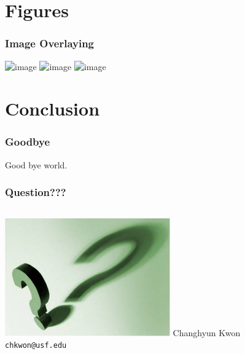 \documentclass[xcolor=dvipsnames, unicode, mathserif]{beamer}
\begin{document}

\section[Figures]{Figures}



\begin{frame}
\frametitle{Image Overlaying}
\begin{center}
\includegraphics<1>[width=0.7\textwidth]{image-a}
\includegraphics<2>[width=0.7\textwidth]{image-b}
\includegraphics<3>[width=0.7\textwidth]{image-c}
\end{center}
\end{frame}








\section[Conclusion]{Conclusion}


\begin{frame}
\frametitle{Goodbye}

Good bye world.

\end{frame}




\begin{frame}
\frametitle{Question???}
\begin{columns}[c]
\column{1.5in}
    \includegraphics[height=2in]{question}
\column{1.5in}
    Changhyun Kwon\\
    \texttt{chkwon@usf.edu}
\end{columns}
\end{frame}


%
%
\end{document}
